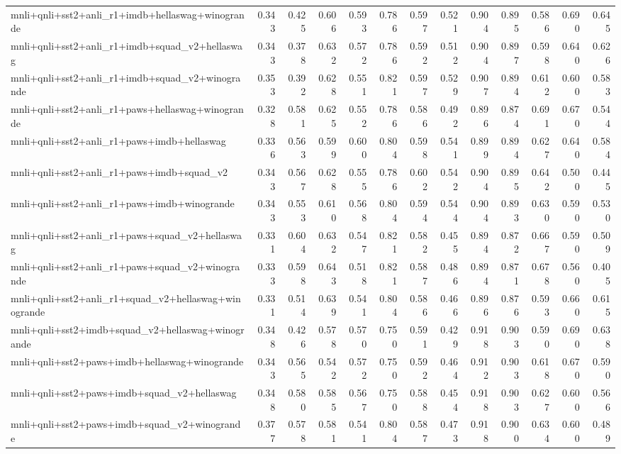 \begin{table}[t]
\begin{tabular}{lrrrrrrrrrrrr}
    mnli+qnli+sst2+anli\_r1+imdb+hellaswag+winogrande & 0.343 & 0.425 & 0.606 & 0.593 & 0.786 & 0.597 & 0.521 & 0.904 & 0.895 & 0.586 & 0.690 & 0.645 \\
    mnli+qnli+sst2+anli\_r1+imdb+squad\_v2+hellaswag & 0.343 & 0.378 & 0.632 & 0.572 & 0.786 & 0.592 & 0.512 & 0.904 & 0.897 & 0.598 & 0.640 & 0.626 \\
    mnli+qnli+sst2+anli\_r1+imdb+squad\_v2+winogrande & 0.353 & 0.392 & 0.628 & 0.551 & 0.821 & 0.597 & 0.529 & 0.907 & 0.894 & 0.612 & 0.600 & 0.583 \\
    mnli+qnli+sst2+anli\_r1+paws+hellaswag+winogrande & 0.328 & 0.581 & 0.625 & 0.552 & 0.786 & 0.586 & 0.492 & 0.896 & 0.874 & 0.691 & 0.670 & 0.544 \\
    mnli+qnli+sst2+anli\_r1+paws+imdb+hellaswag & 0.336 & 0.563 & 0.599 & 0.600 & 0.804 & 0.598 & 0.541 & 0.899 & 0.894 & 0.627 & 0.640 & 0.584 \\
    mnli+qnli+sst2+anli\_r1+paws+imdb+squad\_v2 & 0.343 & 0.567 & 0.628 & 0.555 & 0.786 & 0.602 & 0.542 & 0.904 & 0.895 & 0.642 & 0.500 & 0.445 \\
    mnli+qnli+sst2+anli\_r1+paws+imdb+winogrande & 0.343 & 0.553 & 0.610 & 0.568 & 0.804 & 0.594 & 0.544 & 0.904 & 0.893 & 0.630 & 0.590 & 0.530 \\
    mnli+qnli+sst2+anli\_r1+paws+squad\_v2+hellaswag & 0.331 & 0.604 & 0.632 & 0.547 & 0.821 & 0.582 & 0.455 & 0.894 & 0.872 & 0.667 & 0.590 & 0.509 \\
    mnli+qnli+sst2+anli\_r1+paws+squad\_v2+winogrande & 0.333 & 0.598 & 0.643 & 0.518 & 0.821 & 0.587 & 0.486 & 0.894 & 0.871 & 0.678 & 0.560 & 0.405 \\
    mnli+qnli+sst2+anli\_r1+squad\_v2+hellaswag+winogrande & 0.331 & 0.514 & 0.639 & 0.541 & 0.804 & 0.586 & 0.466 & 0.896 & 0.876 & 0.593 & 0.660 & 0.615 \\
    mnli+qnli+sst2+imdb+squad\_v2+hellaswag+winogrande & 0.348 & 0.426 & 0.578 & 0.570 & 0.750 & 0.591 & 0.429 & 0.918 & 0.903 & 0.590 & 0.690 & 0.638 \\
    mnli+qnli+sst2+paws+imdb+hellaswag+winogrande & 0.343 & 0.565 & 0.542 & 0.572 & 0.750 & 0.592 & 0.464 & 0.912 & 0.903 & 0.618 & 0.670 & 0.590 \\
    mnli+qnli+sst2+paws+imdb+squad\_v2+hellaswag & 0.348 & 0.580 & 0.585 & 0.567 & 0.750 & 0.588 & 0.454 & 0.918 & 0.903 & 0.627 & 0.600 & 0.566 \\
    mnli+qnli+sst2+paws+imdb+squad\_v2+winogrande & 0.377 & 0.578 & 0.581 & 0.541 & 0.804 & 0.587 & 0.473 & 0.918 & 0.900 & 0.634 & 0.600 & 0.489 \\

\end{tabular}
\end{table}
